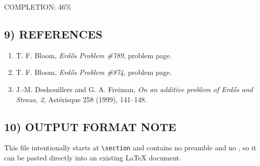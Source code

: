 COMPLETION: 46\%

\subsection*{9) REFERENCES}

\begin{enumerate}
\item T. F. Bloom, \emph{Erd\H{o}s Problem \#789}, problem page.
\item T. F. Bloom, \emph{Erd\H{o}s Problem \#874}, problem page.
\item J.-M. Deshouillers and G. A. Freiman, \emph{On an additive problem of Erd\H{o}s and Straus, 2}, Ast\'erisque 258 (1999), 141--148.
\end{enumerate}

\subsection*{10) OUTPUT FORMAT NOTE}

This file intentionally starts at \verb|\section| and contains no preamble and no \verb||, so it can be pasted directly into an existing LaTeX document.
